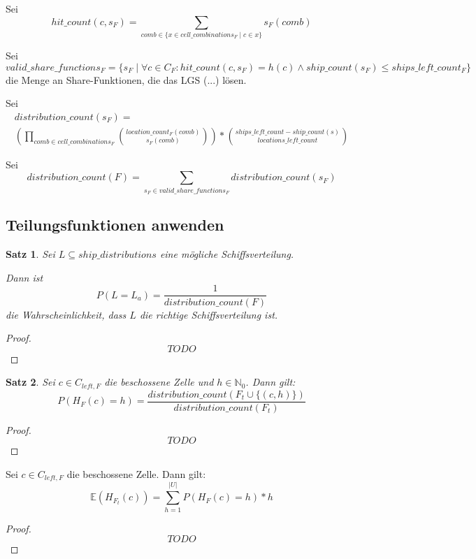 \documentclass[a4paper,12pt]{llncs}
\newcommand{\N}{{\mathbb{N}}}
\numberwithin{equation}{section}
\newtheorem{satz}{Satz}
\begin{document}
\begin{definition}
Sei
\[
hit\_count(c, s_F)=\sum_{comb \in \{x \in cell\_combinations_F \mid c \in x\}}{s_F(comb)}
\]
\end{definition}

\begin{definition}
Sei
\[
valid\_share\_functions_F=\{s_F \mid \forall{c \in C_F}\colon hit\_count(c, s_F)=h(c) \wedge ship\_count(s_F) \leq ships\_left\_count_F\}
\]
die Menge an Share-Funktionen, die das LGS (...) lösen.
\end{definition}

\begin{definition}
Sei
\begin{align}
distribution\_count(s_F)=\\
\left( \prod_{comb \in cell\_combinations_F}{{location\_count_F(comb)\choose s_F(comb)}} \right) * {ships\_left\_count - ship\_count(s)\choose locations\_left\_count}
\end{align}
\end{definition}

\begin{definition}
Sei
\[
distribution\_count(F)=\sum_{s_F \in valid\_share\_functions_F}{distribution\_count(s_F)}
\]
\end{definition}

\subsection{Teilungsfunktionen anwenden}

\begin{satz}
Sei $L \subseteq ship\_distributions$ eine mögliche Schiffsverteilung.

Dann ist
\[
P(L = L_a)=\frac{1}{distribution\_count(F)}
\]
die Wahrscheinlichkeit, dass $L$ die richtige Schiffsverteilung ist.
\end{satz}

\begin{proof}
\[
TODO
\]
\end{proof}

\begin{satz}
Sei $c \in C_{left,F}$ die beschossene Zelle und $h \in \N_0$.
Dann gilt:
\[
P(H_F(c)=h)=\frac{distribution\_count(F_t \cup \{(c, h)\})}{distribution\_count(F_t)}
\]
\end{satz}

\begin{proof}
\[
TODO
\]
\end{proof}

\begin{theorem}
Sei $c \in C_{left,F}$ die beschossene Zelle.
Dann gilt:
\[
\mathds{E}(H_{F_t}(c))=\sum_{h=1}^{|U|} P(H_F(c)=h) * h
\]
\end{theorem}

\begin{proof}
\[
TODO
\]
\end{proof}

\newpage

 

\end{document}
